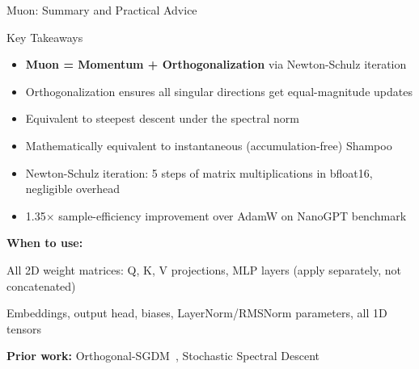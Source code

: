 \begin{frame}{Muon: Summary and Practical Advice}

  \begin{block}{Key Takeaways}
    \begin{itemize}
      \item \textbf{Muon = Momentum + Orthogonalization} via Newton-Schulz iteration
      \item Orthogonalization ensures all singular directions get equal-magnitude updates
      \item Equivalent to steepest descent under the spectral norm
      \item Mathematically equivalent to instantaneous (accumulation-free) Shampoo
      \item Newton-Schulz iteration: 5 steps of matrix multiplications in bfloat16, negligible overhead
      \item 1.35$\times$ sample-efficiency improvement over AdamW on NanoGPT benchmark
    \end{itemize}
  \end{block}

  \vspace{0.3em}
  \textbf{When to use:}
  \begin{description}[leftmargin=0.3em, labelwidth=\widthof{\bfseries Muon + AdamW}]
    \item[Muon] All 2D weight matrices: Q, K, V projections, MLP layers (apply separately, not concatenated)
    \item[AdamW] Embeddings, output head, biases, LayerNorm/RMSNorm parameters, all 1D tensors
  \end{description}

  \vspace{0.3em}
  \textbf{Prior work:} Orthogonal-SGDM~\cite{tuddenham2022orthogonal}, Stochastic Spectral Descent~\cite{carlson2015stochastic}
\end{frame}
